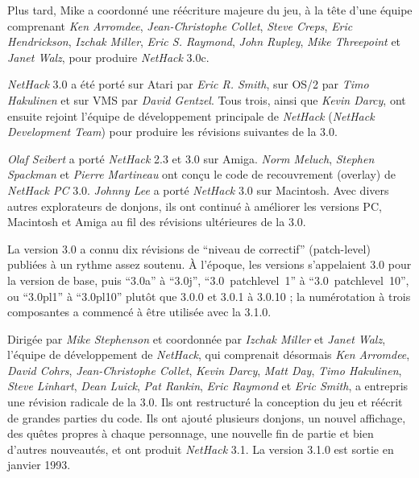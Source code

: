 \documentclass[titlepage]{article}
\begin{document}
\medskip
\noindent Plus tard, Mike a coordonné une réécriture majeure du jeu, à la tête d'une équipe
comprenant \textit{Ken Arromdee}, \textit{Jean-Christophe Collet}, \textit{Steve Creps},
\textit{Eric Hendrickson}, \textit{Izchak Miller}, \textit{Eric S. Raymond}, \textit{John
Rupley}, \textit{Mike Threepoint} et \textit{Janet Walz}, pour produire
\textit{NetHack} 3.0c.

\medskip
\noindent \textit{NetHack} 3.0 a été porté sur Atari par \textit{Eric R. Smith}, sur OS/2 par
\textit{Timo Hakulinen} et sur VMS par \textit{David Gentzel}.  Tous trois,
ainsi que \textit{Kevin Darcy}, ont ensuite rejoint l'équipe de développement principale de \textit{NetHack} (\textit{NetHack Development Team}) pour produire
les révisions suivantes de la 3.0.

\medskip
\noindent \textit{Olaf Seibert} a porté \textit{NetHack} 2.3 et 3.0 sur Amiga.  {\it
Norm Meluch}, \textit{Stephen Spackman} et \textit{Pierre Martineau} ont conçu
le code de recouvrement (overlay) de \textit{NetHack PC} 3.0.  \textit{Johnny Lee} a porté
\textit{NetHack} 3.0 sur Macintosh.  Avec divers autres explorateurs de donjons, ils
ont continué à améliorer les versions PC, Macintosh et Amiga au fil des
révisions ultérieures de la 3.0.

La version 3.0 a connu dix révisions de ``niveau de correctif'' (patch-level)
publiées à un rythme assez soutenu.
À l'époque, les versions s'appelaient 3.0 pour la version de base, puis
``3.0a'' à ``3.0j'',
``3.0~patchlevel~1'' à ``3.0~patchlevel~10'',
ou ``3.0pl1'' à ``3.0pl10''
plutôt que 3.0.0 et 3.0.1 à 3.0.10 ;
la numérotation à trois composantes a commencé à être utilisée avec la 3.1.0.

\medskip
\noindent Dirigée par \textit{Mike Stephenson} et coordonnée par \textit{Izchak Miller}
et \textit{Janet Walz}, l'équipe de développement de \textit{NetHack}, qui comprenait désormais
\textit{Ken Arromdee},
\textit{David Cohrs}, \textit{Jean-Christophe Collet}, \textit{Kevin Darcy},
\textit{Matt Day}, \textit{Timo Hakulinen}, \textit{Steve Linhart}, \textit{Dean Luick},
\textit{Pat Rankin}, \textit{Eric Raymond} et \textit{Eric Smith}, a entrepris une
révision radicale de la 3.0.
Ils ont restructuré la conception du jeu et réécrit de grandes
parties du code.
Ils ont ajouté plusieurs donjons, un nouvel affichage, des quêtes
propres à chaque personnage, une nouvelle fin de partie et bien d'autres nouveautés, et
ont produit \textit{NetHack} 3.1.
La version 3.1.0 est sortie en janvier 1993.
\end{document}
